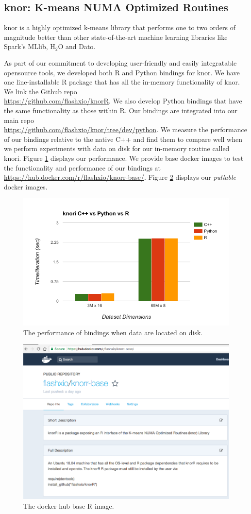 \documentclass[simplex.tex]{subfiles}
\begin{document}
\subsection{knor: K-means NUMA Optimized Routines}

\textsf{knor} is a highly optimized k-means library that performs one to two
orders of magnitude better than other state-of-the-art machine learning
libraries like Spark's MLlib, H$_2$O and Dato.

As part of our commitment to developing user-friendly and easily integratable
opensource tools, we developed both R and Python bindings for \textsf{knor}.
We have one line-installable R
package that has all the in-memory functionality of \textsf{knor}. We link the
Github repo \\
\href{https://github.com/flashxio/knorR}{https://github.com/flashxio/knorR}.
We also develop Python bindings that have the same functionality as those within
R. Our bindings are integrated into our main repo \\
\href{https://github.com/flashxio/knor/tree/dev/python}{https://github.com/flashxio/knor/tree/dev/python}.
We measure the performance of our bindings relative to the native C++ and find
them to compare well when we perform experiments with data on disk for our
in-memory routine called \textsf{knori}. Figure \ref{fig:bindings} displays our
performance. We provide base docker images to test the functionality and
performance of our bindings at\\
\href{https://hub.docker.com/r/flashxio/knorr-base/}{https://hub.docker.com/r/flashxio/knorr-base/}.
Figure \ref{fig:binding-docker} displays our \textit{pullable} docker images.

\begin{figure}[!h]
\begin{cframed}
    \centering
    \includegraphics[width=.45\textwidth]{../../figs/binding-from-disk.png}
\caption{The performance of bindings when data are located on disk.}
\label{fig:bindings}
\end{cframed}
\end{figure}

\begin{figure}[!h]
\begin{cframed}
    \centering
    \includegraphics[width=.45\textwidth]{../../figs/binding-docker.png}
\caption{The docker hub base R image.}
\label{fig:binding-docker}
\end{cframed}
\end{figure}

\clearpage
\end{document}
